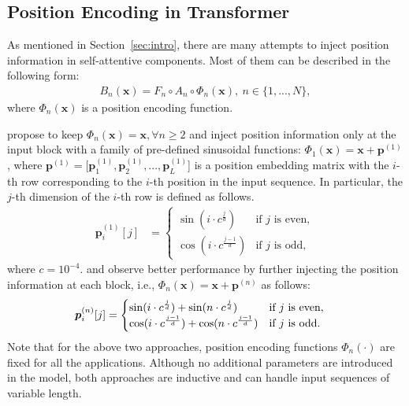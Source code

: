 \documentclass[11pt]{article}
\def\vp{{\bm{p}}}
\def\vx{{\bm{x}}}
\begin{document}
\subsection{Position Encoding in Transformer}
\label{sec:pos-enc-formulation}
As mentioned in Section~\ref{sec:intro}, there are many attempts to inject position information in self-attentive components. Most of them can be described in the following form:
\begin{align}
    B_{n}(\vx) = F_n \circ A_n \circ \Phi_n (\vx),\ n \in \{1,...,N\}, 
\end{align}
where $\Phi_n(\vx)$ is a position encoding function.  

\cite{vaswani2017attention} propose to keep $\Phi_{n}(\vx)=\vx, \forall n \ge 2$ and inject position information only at the input block with a family of pre-defined sinusoidal functions: $\Phi_1(\vx) = \vx + \vp^{(1)}$, where $\vp^{(1)} = [\vp^{(1)}_1, \vp^{(1)}_2, ..., \vp^{(1)}_L$] is a position embedding matrix with the $i$-th row corresponding to the $i$-th position in the input sequence. In particular, the $j$-th dimension of the $i$-th row is defined as follows. 
\begin{align}\label{eq:sin-encoding}
    \vp^{(1)}_i[j] &= 
    \begin{cases}
    \sin(i\cdot c^{\frac{j}{d}}) & \text{if $j$ is even}, \\
    \cos(i\cdot c^{\frac{j-1}{d}}) & \text{if $j$ is odd},
    \end{cases}
\end{align} 
where $c=10^{-4}$.
\cite{dehghani2018universal} and \cite{lan2019albert} observe better performance by further injecting the position information at each block, i.e., $\Phi_n(\vx) = \vx + \vp^{(n)}$ as follows:
\begin{align}\label{eq:universal-position-encoding}
    \vp^{(n)}_i[j]\vspace{-1em} &= \vspace{-1em}
    \begin{cases} 
    \sin(i\cdot {c}^{\frac{j}{d}}) + 
    \sin(n\cdot {c}^{\frac{j}{d}}) & \text{if $j$ is even}, \\
    \cos(i\cdot {c}^{\frac{j-1}{d}}) + 
    \cos(n\cdot {c}^{\frac{j-1}{d}}) & \text{if $j$ is odd}.
    \end{cases}
\end{align}
Note that for the above two approaches, position encoding functions $\Phi_n(\cdot)$ are fixed for all the applications. Although no additional parameters are introduced in the model, both approaches are inductive and can handle input sequences of variable length. 
\end{document}
